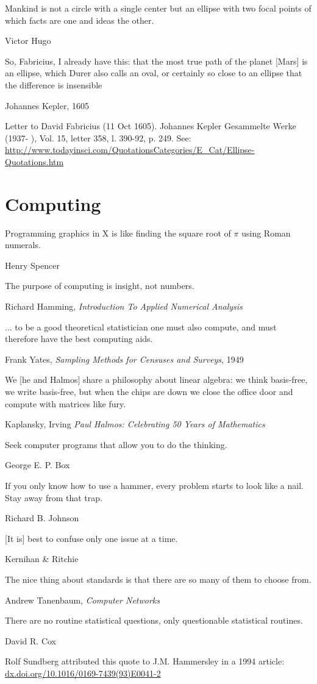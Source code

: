 \epigraph{Mankind is not a circle with a single center but an ellipse with two focal points of which facts are one and ideas the other.}{Victor Hugo}

\epigraph{So, Fabricius, I already have this: that the most true path of the planet [Mars] is an ellipse, which Durer also calls an oval, or certainly so close to an ellipse that the difference is insensible}{Johannes Kepler, 1605}

Letter to David Fabricius (11 Oct 1605). Johannes Kepler Gesammelte Werke (1937- ), Vol. 15, letter 358, l. 390-92, p. 249.
See: \url{http://www.todayinsci.com/QuotationsCategories/E_Cat/Ellipse-Quotations.htm}


\section{Computing}

\epigraph{Programming graphics in X is like finding the square root of $\pi$ using Roman numerals.}{Henry Spencer}

\epigraph{The purpose of computing is insight, not numbers.}{Richard Hamming, \emph{Introduction To Applied Numerical Analysis}}

\epigraph{... to be a good theoretical statistician one must also compute, and must therefore have the best computing aids.}{Frank Yates, \emph{Sampling Methods for Censuses and Surveys}, 1949}

\epigraph{We [he and Halmos] share a philosophy about linear algebra: we think basis-free, we write basis-free, but when the chips are down we close the office door and compute with matrices like fury.}{Kaplansky, Irving \emph{Paul Halmos: Celebrating 50 Years of Mathematics}}

\epigraph{Seek computer programs that allow you to do the thinking.}{George E. P. Box}

\epigraph{If you only know how to use a hammer, every problem starts to look like a nail.  Stay away from that trap.}{Richard B. Johnson}

\epigraph{[It is] best to confuse only one issue at a time.}{Kernihan \& Ritchie}

\epigraph{The nice thing about standards is that there are so many of them to choose from.}{Andrew Tanenbaum, \emph{Computer Networks}}

\epigraph{There are no routine statistical questions, only questionable statistical routines.}{David R. Cox}
Rolf Sundberg attributed this quote to J.M. Hammersley in a 1994 article: \url{dx.doi.org/10.1016/0169-7439(93)E0041-2}

